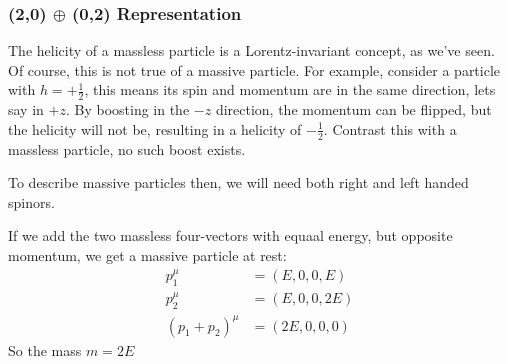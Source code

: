 \subsubsection{(2,0) $\oplus$ (0,2) Representation}
The helicity of a massless particle is a Lorentz-invariant concept, as we've seen. Of course, this is not true of a massive particle. For example, consider a particle with $h=+\frac12$, this means its spin and momentum are in the same direction, lets say in $+z$. By boosting in the $-z$ direction, the momentum can be flipped, but the helicity will not be, resulting in a helicity of $-\frac12$. Contrast this with a massless particle, no such boost exists.

To describe massive particles then, we will need both right and left handed spinors.

If we add the two massless four-vectors with equaal energy, but opposite momentum, we get a massive particle at rest:
\begin{align*}
  p_1^\mu&=(E,0,0,E)\\
  p_2^\mu&=(E,0,0,2E)\\
  {(p_1+p_2)}^\mu&=(2E,0,0,0)
\end{align*}
So the mass $m=2E$

